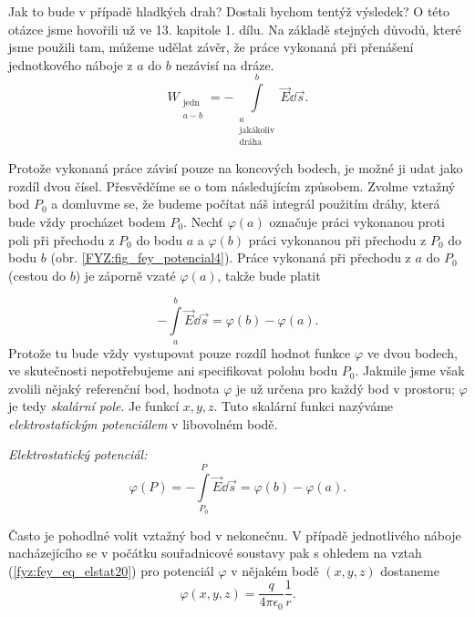     Jak to bude v případě hladkých drah? Dostali bychom tentýž výsledek? O této otázce jsme hovořili 
    už ve 13. kapitole 1. dílu. Na základě stejných důvodů, které jsme použili tam, můžeme udělat 
    závěr, že práce vykonaná při přenášení jednotkového náboje z \(a\) do \(b\) nezávisí na dráze.   
    \begin{equation*}
      W_{\substack{\text{jedn}\\ a-b}} = 
       - \int\limits_{\substack{a\\\text{jakákoliv}\\\text{dráha}}}^b\vec{E}\dd{\vec{s}}.
    \end{equation*}      
    
    Protože vykonaná práce závisí pouze na koncových bodech, je možné ji udat jako rozdíl dvou 
    čísel. Přesvědčíme se o tom následujícím způsobem. Zvolme vztažný bod \(P_0\) a domluvme se, že 
    budeme počítat náš integrál použitím dráhy, která bude vždy procházet bodem \(P_0\). Nechť 
    \(\varphi(a)\) označuje práci vykonanou proti poli při přechodu z \(P_0\) do bodu \(a\) a 
    \(\varphi(b)\) práci vykonanou při přechodu z \(P_0\) do bodu \(b\) (obr. 
    \ref{FYZ:fig_fey_potencial4}). Práce vykonaná při přechodu z \(a\) do \(P_0\) (cestou do \(b\)) 
    je záporně vzaté \(\varphi(a)\), takže bude platit
    
    \begin{equation}\label{fyz:fey_eq_elstat21}
     - \int\limits_{a}^{b}\vec{E}\dd{\vec{s}} = \varphi(b) - \varphi(a). 
    \end{equation}
    Protože tu bude vždy vystupovat pouze rozdíl hodnot funkce \(\varphi\) ve dvou bodech, ve 
    skutečnosti nepotřebujeme ani specifikovat polohu bodu \(P_0\). Jakmile jsme však zvolili nějaký 
    referenční bod, hodnota \(\varphi\) je už určena pro každý bod v prostoru; \(\varphi\) je tedy 
    \emph{skalární pole}. Je funkcí \(x, y, z\). Tuto skalární funkci nazýváme 
    \emph{elektrostatickým potenciálem} v libovolném bodě.

    \emph{Elektrostatický potenciál:}
     \begin{equation}\label{fyz:fey_eq_elstat22}
       \varphi(P) = - \int\limits_{P_0}^{P}\vec{E}\dd{\vec{s}} = \varphi(b) - \varphi(a). 
     \end{equation} 
    
    Často je pohodlné volit vztažný	bod v nekonečnu. V případě jednotlivého	náboje nacházejícího se 
    v počátku souřadnicové soustavy pak s ohledem	na vztah (\ref{fyz:fey_eq_elstat20}) pro potenciál 
    \(\varphi\) v nějakém bodě \((x, y, z)\) dostaneme
    \begin{equation}\label{fyz:fey_eq_elstat23}
     \varphi(x, y, z) = \frac{q}{4\pi\epsilon_0}\frac{1}{r}. 
    \end{equation}

